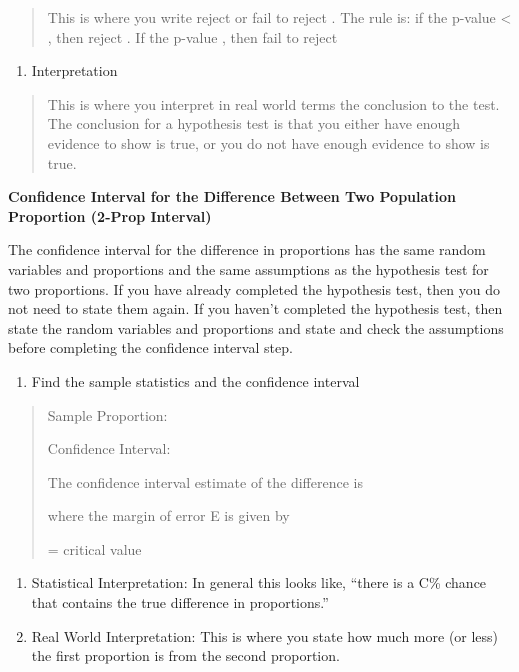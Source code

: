 \documentclass[]{book}
\providecommand{\tightlist}{%
  \setlength{\itemsep}{0pt}\setlength{\parskip}{0pt}}
\begin{document}
\begin{quote}
This is where you write reject or fail to reject . The rule is: if the
p-value \textless{} , then reject . If the p-value , then fail to reject
\end{quote}

\begin{enumerate}
\def\labelenumi{\arabic{enumi}.}
\setcounter{enumi}{5}
\tightlist
\item
  Interpretation
\end{enumerate}

\begin{quote}
This is where you interpret in real world terms the conclusion to the
test. The conclusion for a hypothesis test is that you either have
enough evidence to show is true, or you do not have enough evidence to
show is true.
\end{quote}

\textbf{Confidence Interval for the Difference Between Two Population
Proportion (2-Prop Interval)}

The confidence interval for the difference in proportions has the same
random variables and proportions and the same assumptions as the
hypothesis test for two proportions. If you have already completed the
hypothesis test, then you do not need to state them again. If you
haven't completed the hypothesis test, then state the random variables
and proportions and state and check the assumptions before completing
the confidence interval step.

\begin{enumerate}
\def\labelenumi{\arabic{enumi}.}
\tightlist
\item
  Find the sample statistics and the confidence interval
\end{enumerate}

\begin{quote}
Sample Proportion:

Confidence Interval:

The confidence interval estimate of the difference is

where the margin of error E is given by

= critical value
\end{quote}

\begin{enumerate}
\def\labelenumi{\arabic{enumi}.}
\setcounter{enumi}{1}
\item
  Statistical Interpretation: In general this looks like, ``there is a
  C\% chance that contains the true difference in proportions.''
\item
  Real World Interpretation: This is where you state how much more (or
  less) the first proportion is from the second proportion.
\end{enumerate}
\end{document}
